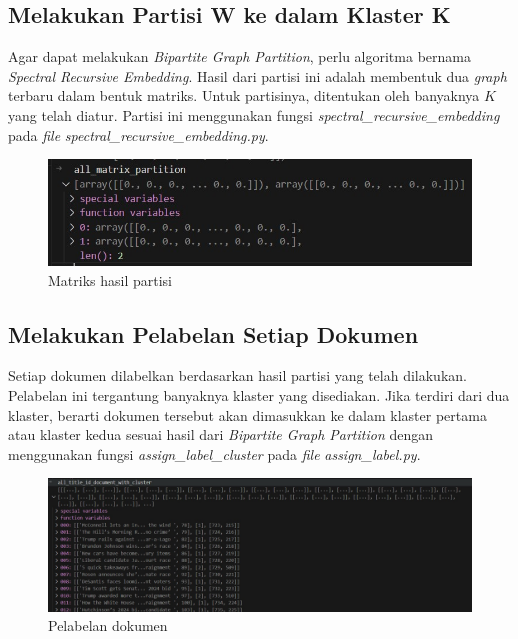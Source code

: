 \subsection{Melakukan Partisi W ke dalam Klaster K}

Agar dapat melakukan \textit{Bipartite Graph Partition}, perlu algoritma 
bernama \textit{Spectral Recursive Embedding}. Hasil dari partisi ini adalah
membentuk dua \textit{graph} terbaru dalam bentuk matriks. Untuk partisinya,
ditentukan oleh banyaknya $K$ yang telah diatur. Partisi ini menggunakan
fungsi \textit{spectral\_recursive\_embedding} pada \textit{file} 
\textit{spectral\_recursive\_embedding.py}.

\begin{figure}[H]
  \centering
  \includegraphics[width=1\textwidth]{gambar/bab_4_image/matrix partisi.jpg}
  \caption{Matriks hasil partisi}
  \label{gambar:matriksPartisi}
\end{figure}

\subsection{Melakukan Pelabelan Setiap Dokumen}

Setiap dokumen dilabelkan berdasarkan hasil partisi yang telah dilakukan.
Pelabelan ini tergantung banyaknya klaster yang disediakan. Jika terdiri
dari dua klaster, berarti dokumen tersebut akan dimasukkan ke dalam klaster
pertama atau klaster kedua sesuai hasil dari \textit{Bipartite Graph Partition} dengan
menggunakan fungsi \textit{assign\_label\_cluster} pada \textit{file}
\textit{assign\_label.py}.

\begin{figure}[H]
  \centering
  \includegraphics[width=1\textwidth]{gambar/bab_4_image/pelabelan dokumen.jpg}
  \caption{Pelabelan dokumen}
  \label{gambar:pelabelanDokumen}
\end{figure}

